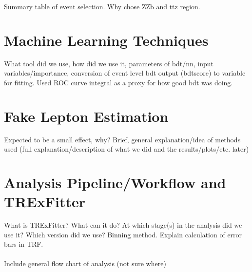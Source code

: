 Summary table of event selection. Why chose ZZb and ttz region. 
\section{Machine Learning Techniques}
What tool did we use, how did we use it, parameters of bdt/nn, input variables/importance, conversion of event level bdt output (bdtscore) to variable for fitting. Used ROC curve integral as a proxy for how good bdt was doing. 
\section{Fake Lepton Estimation} 
Expected to be a small effect, why? Brief, general explanation/idea of methods used (full explanation/description of what we did and the results/plots/etc. later) 
\section{Analysis Pipeline/Workflow and TRExFitter}
What is TRExFitter? What can it do? At which stage(s) in the analysis did we use it? Which version did we use? Binning method. Explain calculation of error bars in TRF. \\\\ 
Include general flow chart of analysis (not sure where)

